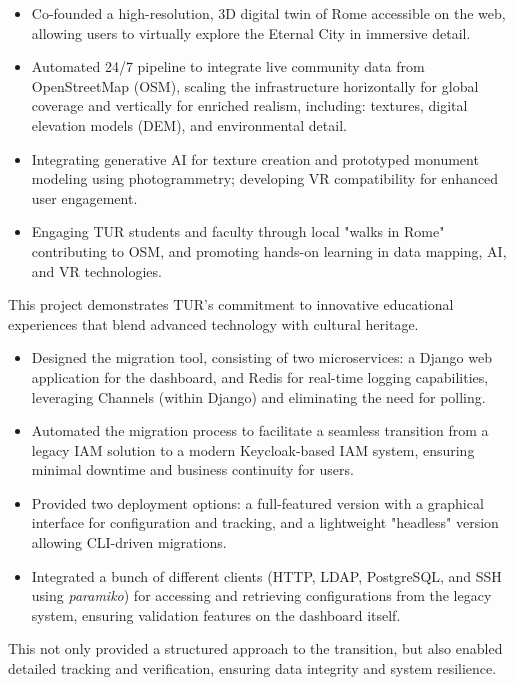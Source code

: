 \begin{itemize}
	\item Co-founded a high-resolution, 3D digital twin of Rome accessible on the web, allowing users to virtually explore the Eternal City in immersive detail.
	\item Automated 24/7 pipeline to integrate live community data from OpenStreetMap (OSM), scaling the infrastructure horizontally for global coverage and vertically for enriched realism, including: textures, digital elevation models (DEM), and environmental detail.
	\item Integrating generative AI for texture creation and prototyped monument modeling using photogrammetry; developing VR compatibility for enhanced user engagement.
	\item Engaging TUR students and faculty through local "walks in Rome" contributing to OSM, and promoting hands-on learning in data mapping, AI, and VR technologies.
\end{itemize}
\smallskip
This project demonstrates TUR's commitment to innovative educational experiences that blend advanced technology with cultural heritage.

\divider

\begin{itemize}
	\item Designed the migration tool, consisting of two microservices: a Django web application for the dashboard, and Redis for real-time logging capabilities, leveraging Channels (within Django) and eliminating the need for polling.
	\item Automated the migration process to facilitate a seamless transition from a legacy IAM solution to a modern Keycloak-based IAM system, ensuring minimal downtime and business continuity for users.
	\item Provided two deployment options: a full-featured version with a graphical interface for configuration and tracking, and a lightweight "headless" version allowing CLI-driven migrations.
	\item Integrated a bunch of different clients (HTTP, LDAP, PostgreSQL, and SSH using \emph{paramiko}) for accessing and retrieving configurations from the legacy system, ensuring validation features on the dashboard itself.
\end{itemize}
\smallskip
This not only provided a structured approach to the transition, but also enabled detailed tracking and verification, ensuring data integrity and system resilience.

